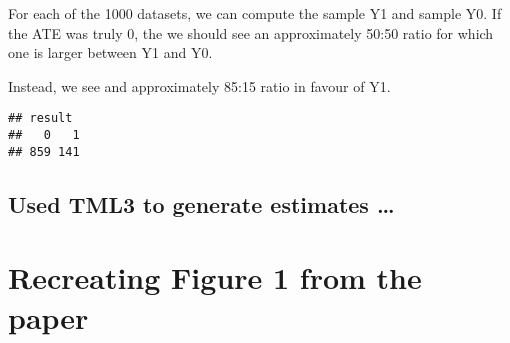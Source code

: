 \documentclass[
]{article}
\newenvironment{Shaded}{\begin{snugshade}}{\end{snugshade}}
\newcommand{\ControlFlowTok}[1]{\textcolor[rgb]{0.13,0.29,0.53}{\textbf{#1}}}
\newcommand{\DecValTok}[1]{\textcolor[rgb]{0.00,0.00,0.81}{#1}}
\newcommand{\FunctionTok}[1]{\textcolor[rgb]{0.13,0.29,0.53}{\textbf{#1}}}
\newcommand{\NormalTok}[1]{#1}
\newcommand{\OtherTok}[1]{\textcolor[rgb]{0.56,0.35,0.01}{#1}}
\newcommand{\SpecialCharTok}[1]{\textcolor[rgb]{0.81,0.36,0.00}{\textbf{#1}}}
\newcommand{\StringTok}[1]{\textcolor[rgb]{0.31,0.60,0.02}{#1}}
\begin{document}
For each of the 1000 datasets, we can compute the sample Y1 and sample
Y0. If the ATE was truly 0, the we should see an approximately 50:50
ratio for which one is larger between Y1 and Y0.

Instead, we see and approximately 85:15 ratio in favour of Y1.

\begin{Shaded}
\end{Shaded}

\begin{verbatim}
## result
##   0   1 
## 859 141
\end{verbatim}

\subsection{Used TML3 to generate estimates
\ldots{}}\label{used-tml3-to-generate-estimates}

\section{Recreating Figure 1 from the
paper}\label{recreating-figure-1-from-the-paper}
\end{document}
